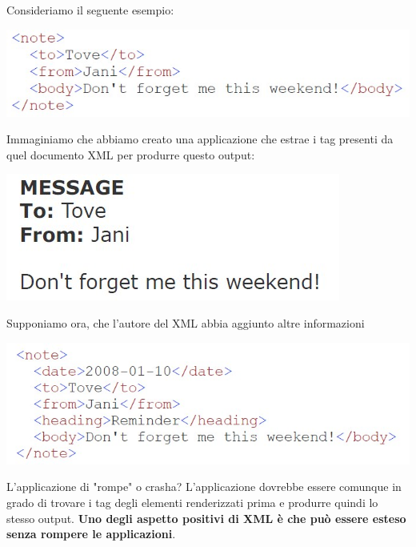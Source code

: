 Consideriamo il seguente esempio:
\begin{center}
    \includegraphics[scale=0.4]{Images/TecnologieWeb/5/NoteTo.jpg}
\end{center}
Immaginiamo che abbiamo creato una applicazione che estrae i tag presenti da quel documento XML per produrre questo output:
\begin{center}
    \includegraphics[scale=0.4]{Images/TecnologieWeb/5/MessaggioRenderizzato.jpg}
\end{center}
Supponiamo ora, che l'autore del XML abbia aggiunto altre informazioni
\begin{center}
    \includegraphics[scale=0.4]{Images/TecnologieWeb/5/NoteDateTo.jpg}
\end{center}
L'applicazione di "rompe" o crasha? L'applicazione dovrebbe essere comunque in grado di trovare i tag degli elementi renderizzati prima e produrre quindi lo stesso output. \textbf{Uno degli aspetto positivi di XML è che può essere esteso senza rompere le applicazioni}.

